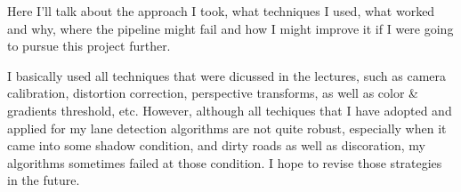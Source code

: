 \documentclass[11pt]{article}
\begin{document}
Here I'll talk about the approach I took, what techniques I used, what
worked and why, where the pipeline might fail and how I might improve it
if I were going to pursue this project further.

I basically used all techniques that were dicussed in the lectures, such
as camera calibration, distortion correction, perspective transforms, as
well as color \& gradients threshold, etc. However, although all
techiques that I have adopted and applied for my lane detection
algorithms are not quite robust, especially when it came into some
shadow condition, and dirty roads as well as discoration, my algorithms
sometimes failed at those condition. I hope to revise those strategies
in the future.


    
    
    
    
\end{document}
